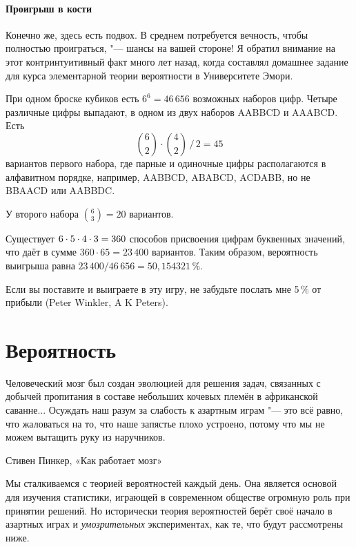 \documentclass[twoside]{book}
\begin{document}
\subsubsection*{Проигрыш в кости}%

Конечно же, здесь есть подвох.
В среднем потребуется вечность, чтобы полностью проиграться, "--- шансы на вашей стороне! 
Я обратил внимание на этот контринтуитивный факт много лет назад, когда составлял домашнее задание для курса элементарной теории вероятности в Университете Эмори.

При одном броске кубиков есть $6^6 =46\,656$ возможных наборов цифр.
Четыре различные цифры выпадают, в одном из двух наборов AABBCD и AAABCD.
Есть
\[\binom62\cdot\binom42\,\big/\,2=45\]
вариантов первого набора, где парные и одиночные цифры располагаются в алфавитном порядке, например, AABBCD, ABABCD, ACDABB, но не BBAACD или AABBDC.

У второго набора $\binom63=20$  вариантов.

Существует $6\cdot 5\cdot 4\cdot 3\z=360$ способов присвоения цифрам буквенных значений, что даёт в сумме $360\cdot 65=23\,400$ вариантов.
Таким образом, вероятность выигрыша равна
$23\,400/46\,656 = 50{,}154321\,\%$.
\heart

Если вы поставите и выиграете в эту игру, не забудьте послать мне 5\,\% от прибыли 
(Peter Winkler,  A  K Peters).



\chapter{Вероятность}

\setlength{\epigraphwidth}{.8\textwidth}
\epigraph{Человеческий мозг был создан эволюцией для решения задач, связанных с добычей пропитания в составе небольших кочевых племён в африканской саванне...
  Осуждать наш разум за слабость к азартным играм "--- это всё равно, что жаловаться на то, что наше запястье плохо устроено, потому что мы не можем вытащить руку из наручников.%
}{Стивен Пинкер, «Как работает мозг»%
}

Мы сталкиваемся с теорией вероятностей каждый день.
Она является основой для изучения статистики, играющей в современном обществе огромную роль при принятии решений.
Но исторически теория вероятностей берёт своё начало в азартных играх и \emph{умозрительных} экспериментах, как те, что будут рассмотрены ниже.
\end{document}

